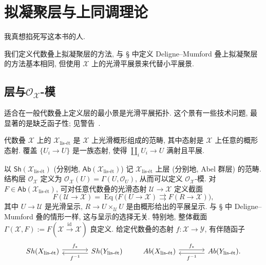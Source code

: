 \section{拟凝聚层与上同调理论}\label{src:7.1}
\begin{epigraph}
我真想掐死写这本书的人.
\end{epigraph}
我们定义代数叠上拟凝聚层的方法, 与 \S{} 中定义 Deligne--Mumford 叠上拟凝聚层的方法基本相同, 但使用 $\mathcal X$ 上的光滑平展景来代替小平展景.
\subsection{层与\texorpdfstring{$\mathcal O_{\mathcal X}$}{OX}-模}\label{src:7.1.1-subsection}
适合在一般代数叠上定义层的最小景是光滑平展拓扑. 这个景有一些技术问题, 最显著的是缺乏函子性; 见警告~.
\begin{definition}[光滑平展景]\label{src:7.1.1}
代数叠 $\mathcal X$ 上的 $\mathcal X_{\text{lis-ét}}$ 是 $\mathcal X$ 上光滑概形组成的范畴, 其中态射是 $\mathcal X$ 上任意的概形态射. 覆盖 $\{U_i\to U\}$ 是一族态射, 使得 $\coprod_iU_i\to U$ 满射且平展.
\end{definition}
以 $\mathsf{Sh}(\mathcal X_{\text{lis-ét}})$ (分别地, $\mathsf{Ab}(\mathcal X_{\text{lis-ét}})$) 记 $\mathcal X_{\text{lis-ét}}$ 上层 (分别地, Abel 群层) 的范畴. 结构层 $\mathcal O_{\mathcal X}$ 定义为 $\mathcal O_{\mathcal X}(U)=\Gamma(U,\mathcal O_U)$, 从而可以定义 $\mathcal O_{\mathcal X}$-模. 对 $F\in\mathsf{Ab}(\mathcal X_{\text{lis-ét}})$, 可对任意代数叠的光滑态射 $\mathcal U\to\mathcal X$ 定义截面
\[
F(\mathcal U\to\mathcal X)=\operatorname{Eq}\bigl(F(U\to\mathcal X)\rightrightarrows F(R\to\mathcal X)\bigr),
\]
其中 $U\to\mathcal U$ 是光滑呈示, $R\to U\times_{\mathcal U}U$ 是由概形给出的平展呈示. 与 \S{} 中 Deligne--Mumford 叠的情形一样, 这与呈示的选择无关. 特别地, 整体截面 $\Gamma(\mathcal X,F):=F(\mathcal X\xrightarrow{\mathrm{id}}\mathcal X)$ 良定义.
给定代数叠的态射 $f:\mathcal X\to\mathcal Y$, 有伴随函子
\[
\begin{tikzcd}[ampersand replacement=\&,column sep=large]
\mathsf{Sh}(\mathcal X_{\text{lis-ét}})\arrow[r,shift left,"{f_*}"]\&\mathsf{Sh}(\mathcal Y_{\text{lis-ét}})\arrow[l,shift left,"{f^{-1}}"]
\end{tikzcd}
\qquad
\begin{tikzcd}[ampersand replacement=\&,column sep=large]
\mathsf{Ab}(\mathcal X_{\text{lis-ét}})\arrow[r,shift left,"{f_*}"]\&\mathsf{Ab}(\mathcal Y_{\text{lis-ét}})\arrow[l,shift left,"{f^{-1}}"] .
\end{tikzcd}
\]
